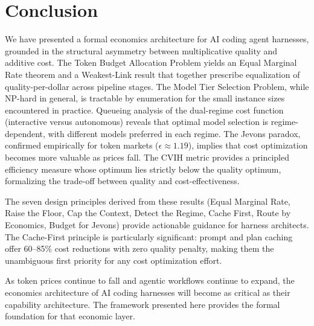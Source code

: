 \documentclass[11pt, a4paper, logo, copyright]{googledeepmind}
\begin{document}
\section{Conclusion}\label{sec:conclusion}

We have presented a formal economics architecture for AI coding agent harnesses, grounded in the structural asymmetry between multiplicative quality and additive cost. The Token Budget Allocation Problem yields an Equal Marginal Rate theorem and a Weakest-Link result that together prescribe equalization of quality-per-dollar across pipeline stages. The Model Tier Selection Problem, while NP-hard in general, is tractable by enumeration for the small instance sizes encountered in practice. Queueing analysis of the dual-regime cost function (interactive versus autonomous) reveals that optimal model selection is regime-dependent, with different models preferred in each regime. The Jevons paradox, confirmed empirically for token markets ($\epsilon \approx 1.19$), implies that cost optimization becomes more valuable as prices fall. The CVIH metric provides a principled efficiency measure whose optimum lies strictly below the quality optimum, formalizing the trade-off between quality and cost-effectiveness.

The seven design principles derived from these results (Equal Marginal Rate, Raise the Floor, Cap the Context, Detect the Regime, Cache First, Route by Economics, Budget for Jevons) provide actionable guidance for harness architects. The Cache-First principle is particularly significant: prompt and plan caching offer 60--85\% cost reductions with zero quality penalty, making them the unambiguous first priority for any cost optimization effort.

As token prices continue to fall and agentic workflows continue to expand, the economics architecture of AI coding harnesses will become as critical as their capability architecture. The framework presented here provides the formal foundation for that economic layer.
\end{document}
